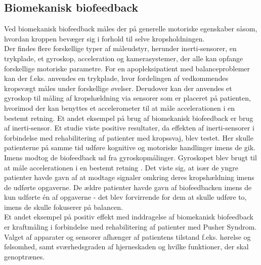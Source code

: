 \subsection{Biomekanisk biofeedback}
Ved biomekanisk biofeedback måles der på generelle motoriske egenskaber såsom, hvordan kroppen bevæger sig i forhold til selve kropsholdningen.  \\
Der findes flere forskellige typer af måleudstyr, herunder inerti-sensorer, en trykplade, et gyroskop, acceleration og kamerasystemer, der alle kan opfange forskellige motoriske parametre. 
For en apopleksipatient med balanceproblemer kan der f.eks. anvendes en trykplade, hvor fordelingen af vedkommendes kropsvægt måles under forskellige øvelser. Derudover kan der anvendes et gyroskop til måling af kropshældning via sensorer som er placeret på patienten, hvorimod der kan benyttes et accelerometer til at måle accelerationen i en bestemt retning.
Et andet eksempel på brug af biomekanisk biofeedback er brug af inerti-sensor.
Et studie viste positive resultater, da effekten af inerti-sensorer i forbindelse med rehabilitering af patienter med kropssvaj, blev testet. \cite{Giggins2013} Her skulle patienterne på samme tid udføre kognitive og motoriske handlinger imens de gik. Imens modtog de biofeedback ud fra gyroskopmålinger. \cite{Giggins2013} Gyroskopet blev brugt til at måle accelerationen i en bestemt retning \cite{Hjaelpemiddelbasen}. Det viste sig, at især de yngre patienter havde gavn af at modtage signaler omkring deres kropshældning imens de udførte opgaverne. De ældre patienter havde gavn af biofeedbacken imens de kun udførte én af opgaverne - det blev forvirrende for dem at skulle udføre to, imens de skulle fokuserer på balancen. \cite{Giggins2013} \\ 
Et andet eksempel på positiv effekt med inddragelse af biomekanisk biofeedback er kraftmåling i forbindelse med rehabilitering af patienter med Pusher Syndrom.
Valget af apparater og sensorer afhænger af patientens tilstand f.eks. hørelse og følsomhed, samt sværhedsgraden af hjerneskaden og hvilke funktioner, der skal genoptrænes. \cite{Hjaelpemiddelbasen}



